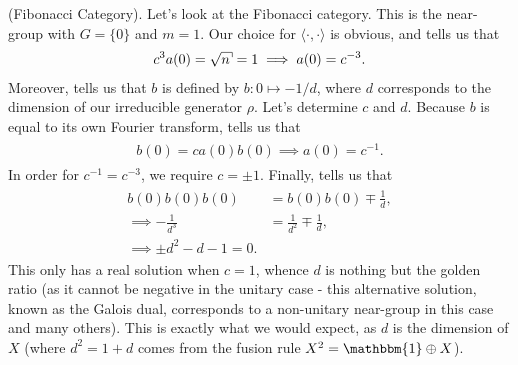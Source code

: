 \noindent\begin{example}\textup{(Fibonacci Category).} Let's look at the Fibonacci category. This is the near-group with $G = \{0\}$ and $m = 1$. Our choice for $\langle\cdot,\cdot\rangle$ is obvious, and \cite[Lemma 7.1]{Izu17} tells us that
\begin{align*}
\begin{split}
c^3 a(0) = \csqrt{n} = 1 \implies a(0) = c^{-3}.
\end{split}
\end{align*}
\noindent Moreover, \cite[Theorem 9.1]{Izu17} tells us that $b$ is defined by $b : 0 \mapsto -1/d$, where $d$ corresponds to the dimension of our irreducible generator $\rho$. Let's determine $c$ and $d$. Because $b$ is equal to its own Fourier transform, \cite[Theorem 9.1]{Izu17} tells us that
\begin{align*}
\begin{split}
b(0) = ca(0)b(0) \implies a(0) = c^{-1}.
\end{split}
\end{align*}
\noindent In order for $c^{-1} = c^{-3}$, we require $c = \pm 1$. Finally, \cite[Equation 9.5]{Izu17} tells us that
\begin{align*}
\begin{split}
b(0)b(0)b(0) &= b(0)b(0) \mp \frac{1}{d},\\
\implies -\frac{1}{d^3} &= \frac{1}{d^2} \mp \frac{1}{d},\\
\implies \pm d^2 - d - 1 = 0.
\end{split}
\end{align*}
\noindent This only has a real solution when $c = 1$, whence $d$ is nothing but the golden ratio (as it cannot be negative in the unitary case - this alternative solution, known as the Galois dual, corresponds to a non-unitary near-group in this case and many others). This is exactly what we would expect, as $d$ is the dimension of $X$ (where $d^2 = 1 + d$ comes from the fusion rule $X^2 = \mathbbm{1} \oplus X$).\\
\end{example}

